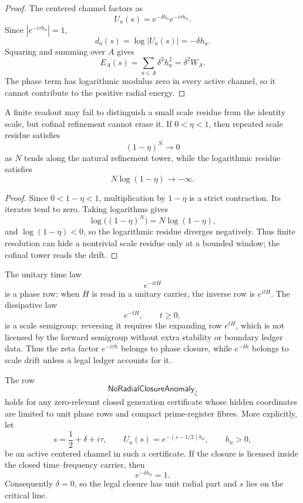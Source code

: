 \begin{proof}
The centered channel factors as
$$
U_a(s)=e^{-\delta h_a}e^{-i\tau h_a}.
$$
Since $|e^{-i\tau h_a}|=1$,
$$
d_a(s)=\log |U_a(s)|=-\delta h_a.
$$
Squaring and summing over $A$ gives
$$
E_A(s)=\sum_{a\in A}\delta^2h_a^2=\delta^2W_A.
$$
The phase term has logarithmic modulus zero in every active channel, so
it cannot contribute to the positive radial energy.
\end{proof}

\begin{corollary}
\label{cor:unified-reality-finite-resolution-does-not-remove-scale-drift}
A finite readout may fail to distinguish a small scale residue from the
identity scale, but cofinal refinement cannot erase it.  If
$0<\eta<1$, then repeated scale residue satisfies
$$
(1-\eta)^N\to0
$$
as $N$ tends along the natural refinement tower, while the logarithmic
residue satisfies
$$
N\log(1-\eta)\to-\infty.
$$
\end{corollary}

\begin{proof}
Since $0<1-\eta<1$, multiplication by $1-\eta$ is a strict contraction.
Its iterates tend to zero.  Taking logarithms gives
$$
\log\bigl((1-\eta)^N\bigr)=N\log(1-\eta),
$$
and $\log(1-\eta)<0$, so the logarithmic residue diverges negatively.
Thus finite resolution can hide a nontrivial scale residue only at a
bounded window; the cofinal tower reads the drift.
\end{proof}

\begin{principle}
\label{prin:unified-reality-phase-time-scale-time}
The unitary time law
$$
e^{-itH}
$$
is a phase row: when $H$ is read in a unitary carrier, the inverse row is
$e^{itH}$.  The dissipative law
$$
e^{-tH},
\qquad
t\ge0,
$$
is a scale semigroup: reversing it requires the expanding row
$e^{tH}$, which is not licensed by the forward semigroup without extra
stability or boundary ledger data.  Thus the zeta factor
$e^{-i\tau h}$ belongs to phase closure, while $e^{-\delta h}$ belongs
to scale drift unless a legal ledger accounts for it.
\end{principle}

\begin{theorem}
\label{thm:unified-reality-no-radial-closure-anomaly}
The row
$$
\mathsf{NoRadialClosureAnomaly}_{\zeta}
$$
holds for any zero-relevant closed generation certificate whose hidden
coordinates are limited to unit phase rows and compact prime-register
fibres.  More explicitly, let
$$
s=\frac12+\delta+i\tau,
\qquad
U_a(s)=e^{-(s-1/2)h_a},
\qquad
h_a>0,
$$
be an active centered channel in such a certificate.  If the closure is
licensed inside the closed time--frequency carrier, then
$$
e^{-\delta h_a}=1.
$$
Consequently $\delta=0$, so the legal closure has unit radial part and
$s$ lies on the critical line.
\end{theorem}

